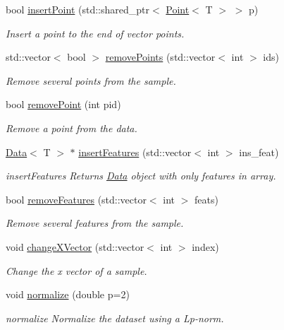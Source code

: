 \begin{DoxyCompactItemize}
bool \mbox{\hyperlink{class_data_a709cae94a533608e61a5e1e5039b0b35}{insert\+Point}} (std\+::shared\+\_\+ptr$<$ \mbox{\hyperlink{class_point}{Point}}$<$ T $>$ $>$ p)
\begin{DoxyCompactList}\small\item\em Insert a point to the end of vector points. \end{DoxyCompactList}\item 
std\+::vector$<$ bool $>$ \mbox{\hyperlink{class_data_ae5a3ca86bedc35bef909aac993439827}{remove\+Points}} (std\+::vector$<$ int $>$ ids)
\begin{DoxyCompactList}\small\item\em Remove several points from the sample. \end{DoxyCompactList}\item 
bool \mbox{\hyperlink{class_data_a92ad77892fa46016d890d4ef4954ef2f}{remove\+Point}} (int pid)
\begin{DoxyCompactList}\small\item\em Remove a point from the data. \end{DoxyCompactList}\item 
\mbox{\hyperlink{class_data}{Data}}$<$ T $>$ $\ast$ \mbox{\hyperlink{class_data_adfd307ae8437b7b2da4372eb604a2c43}{insert\+Features}} (std\+::vector$<$ int $>$ ins\+\_\+feat)
\begin{DoxyCompactList}\small\item\em insert\+Features Returns \mbox{\hyperlink{class_data}{Data}} object with only features in array. \end{DoxyCompactList}\item 
bool \mbox{\hyperlink{class_data_a574b881ce5042c5a13d79c187aa3f923}{remove\+Features}} (std\+::vector$<$ int $>$ feats)
\begin{DoxyCompactList}\small\item\em Remove several features from the sample. \end{DoxyCompactList}\item 
void \mbox{\hyperlink{class_data_a9cf86608e6a02b80c9755646d7cb55fb}{change\+X\+Vector}} (std\+::vector$<$ int $>$ index)
\begin{DoxyCompactList}\small\item\em Change the x vector of a sample. \end{DoxyCompactList}\item 
void \mbox{\hyperlink{class_data_a3271dd8204296537222ed74c5aab1a03}{normalize}} (double p=2)
\begin{DoxyCompactList}\small\item\em normalize Normalize the dataset using a Lp-\/norm. \end{DoxyCompactList}\item 

\end{DoxyCompactItemize}
